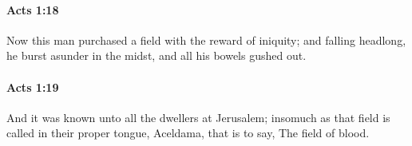 		\paragraph{Acts 1:18} %
			\label{ACTS-1-18}

			Now this man purchased a field with the reward of iniquity; and falling headlong, he burst asunder in the midst, and all his bowels gushed out.

			\begin{framed}
			\scriptsize
				\begin{compactdesc}
					\item[SBLG] 
				\end{compactdesc}
			\end{framed}

		\paragraph{Acts 1:19} %
			\label{ACTS-1-19}

			And it was known unto all the dwellers at Jerusalem; insomuch as that field is called in their proper tongue, Aceldama, that is to say, The field of blood.

